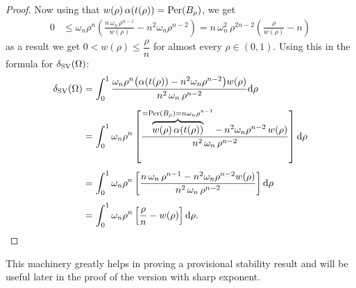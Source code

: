 \documentclass[11pt]{amsart}
\theoremstyle{plain}
\theoremstyle{definition}
\def\dd{{\rm d}}
\newcommand\Per{\mathop{\rm Per}}
\newcommand\SV{\mathop{\rm SV}}
\begin{document}
\begin{proof}
Now using that $w(\rho)\,\alpha(t(\rho))=\Per(B_\rho)$, we get
\begin{align*}
  0&\le\omega_n\rho^n\left(\frac{n\,\omega_n\,\rho^{n-1}}{w(\rho)}-n^2\omega_n\rho^{n-2}\right)
   =n\,\omega_n^2\,\rho^{2n-2}\left(\frac{\rho}{w(\rho)}-n\right)
\end{align*}
as a result we get $0<w(\rho)\le\dfrac{\rho}{n}$ for almost every $\rho \in (0,1)$.
Using this in the formula for $\delta_{\SV}(\Omega)$:
\begin{align*}
  \delta_{\SV}(\Omega)
  &=\int_0^1\frac{\omega_n\rho^n\bigl(\alpha(t(\rho))-n^2\omega_n\rho^{n-2}\bigr)w(\rho)}{n^2\,\omega_n\,\rho^{n-2}} \dd \rho\\[4pt]
  &=\int_0^1\omega_n\rho^n\left[\frac{\overbrace{w(\rho)\,\alpha(t(\rho))}^{=\Per(B_\rho)=n\omega_n\rho^{n-1}}
     -\,n^2\omega_n\rho^{n-2}\,w(\rho)}{n^2\,\omega_n\,\rho^{n-2}}\right]\dd\rho\\[4pt]
  &=\int_0^1\omega_n\rho^n\left[\frac{n\,\omega_n\,\rho^{n-1}-n^2\omega_n\rho^{n-2}w(\rho)}{n^2\,\omega_n\,\rho^{n-2}}\right]\dd\rho\\[4pt]
  &=\int_0^1\omega_n\rho^n\left[\frac{\rho}{n}-w(\rho)\right]\dd\rho.
\end{align*}
\end{proof}
This machinery greatly helps in proving a provisional stability result and will be useful later in the proof of the version with sharp exponent.
\end{document}
